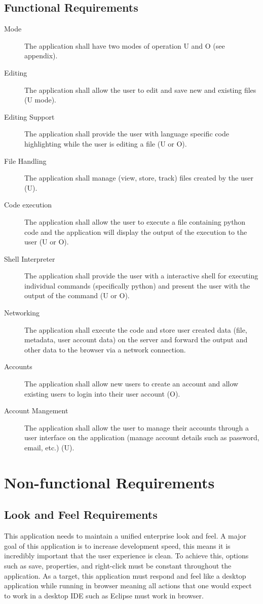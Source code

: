 \documentclass[12pt, titlepage]{article}
\begin{document}
  \subsection{Functional Requirements}
	\begin{description}
		\item [Mode] The application shall have two modes of operation U and O (see
			appendix).
		\item [Editing] The application shall allow the user to edit and
			save new and existing files (U mode).
    \item [Editing Support] The application shall provide the user with
      language specific code highlighting while the user is editing a file (U
      or O).
		\item [File Handling] The application shall manage (view, store, track)
			files created by the user (U).
		\item [Code execution] The application shall allow the user to execute a
			file containing python code and the application will display the output
			of the execution to the user (U or O).
		\item [Shell Interpreter] The application shall provide the user with a
			interactive shell for executing individual commands (specifically python)
			and present the user with the output of the command (U or O).
		\item [Networking] The application shall execute the code and store user
			created data (file, metadata, user account data) on the server and
			forward the output and other data to the browser via a network
			connection.
		\item [Accounts] The application shall allow new users to create an account
			and allow existing users to login into their user account (O).
		\item [Account Mangement] The application shall allow the user to manage
			their accounts through a user interface on the application (manage
			account details such as password, email, etc.) (U).
	\end{description}

\section{Non-functional Requirements}

  \subsection{Look and Feel Requirements}
	This application needs to maintain a unified enterprise look and feel. A
	major goal of this application is to increase development speed, this means
	it is incredibly important that the user experience is clean. To achieve
	this, options such as save, properties, and right-click must be constant
	throughout the application. As a target, this application must respond and
	feel like a desktop application while running in browser meaning all actions
	that one would expect to work in a desktop IDE such as Eclipse must work in
	browser.
\end{document}
